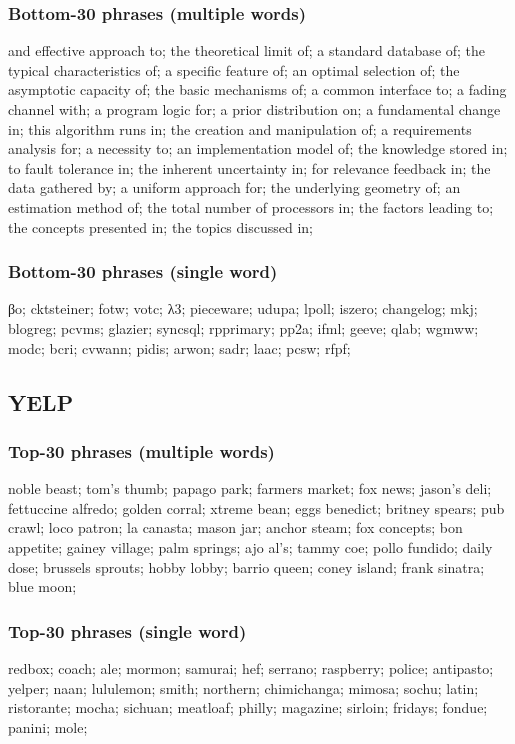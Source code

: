 \documentclass[11pt]{article}
\begin{document}
\subsubsection*{Bottom-30 phrases (multiple words)}
and effective approach to;
the theoretical limit of;
a standard database of;
the typical characteristics of;
a specific feature of;
an optimal selection of;
the asymptotic capacity of;
the basic mechanisms of;
a common interface to;
a fading channel with;
a program logic for;
a prior distribution on;
a fundamental change in;
this algorithm runs in;
the creation and manipulation of;
a requirements analysis for;
a necessity to;
an implementation model of;
the knowledge stored in;
to fault tolerance in;
the inherent uncertainty in;
for relevance feedback in;
the data gathered by;
a uniform approach for;
the underlying geometry of;
an estimation method of;
the total number of processors in;
the factors leading to;
the concepts presented in;
the topics discussed in;

\subsubsection*{Bottom-30 phrases (single word)}
βo;
cktsteiner;
fotw;
votc;
λ3;
pieceware;
udupa;
lpoll;
iszero;
changelog;
mkj;
blogreg;
pcvms;
glazier;
syncsql;
rpprimary;
pp2a;
ifml;
geeve;
qlab;
wgmww;
modc;
bcri;
cvwann;
pidis;
arwon;
sadr;
laac;
pcsw;
rfpf;


\subsection*{YELP}
\subsubsection*{Top-30 phrases (multiple words)}
noble beast;
tom's thumb;
papago park;
farmers market;
fox news;
jason's deli;
fettuccine alfredo;
golden corral;
xtreme bean;
eggs benedict;
britney spears;
pub crawl;
loco patron;
la canasta;
mason jar;
anchor steam;
fox concepts;
bon appetite;
gainey village;
palm springs;
ajo al's;
tammy coe;
pollo fundido;
daily dose;
brussels sprouts;
hobby lobby;
barrio queen;
coney island;
frank sinatra;
blue moon;
\subsubsection*{Top-30 phrases (single word)}
redbox;
coach;
ale;
mormon;
samurai;
hef;
serrano;
raspberry;
police;
antipasto;
yelper;
naan;
lululemon;
smith;
northern;
chimichanga;
mimosa;
sochu;
latin;
ristorante;
mocha;
sichuan;
meatloaf;
philly;
magazine;
sirloin;
fridays;
fondue;
panini;
mole;
\end{document}
